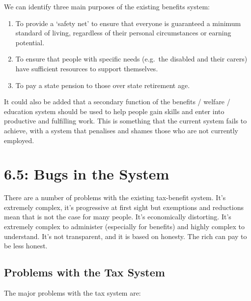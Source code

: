 \documentclass[]{tufte-handout}
\providecommand{\tightlist}{%
  \setlength{\itemsep}{0pt}\setlength{\parskip}{0pt}}
\begin{document}
We can identify three main purposes of the existing benefits system:

\begin{enumerate}
\def\labelenumi{\arabic{enumi}.}
\tightlist
\item
  To provide a `safety net' to ensure that everyone is guaranteed a
  minimum standard of living, regardless of their personal circumstances
  or earning potential.
\item
  To ensure that people with specific needs (e.g.~the disabled and their
  carers) have sufficient resources to support themselves.
\item
  To pay a state pension to those over state retirement age.
\end{enumerate}

It could also be added that a secondary function of the benefits /
welfare / education system should be used to help people gain skills and
enter into productive and fulfilling work. This is something that the
current system fails to achieve, with a system that penalises and shames
those who are not currently employed.

\hypertarget{bugs-in-the-system}{%
\section{6.5: Bugs in the System}\label{bugs-in-the-system}}

There are a number of problems with the existing tax-benefit system.
It's extremely complex, it's progressive at first sight but exemptions
and reductions mean that is not the case for many people. It's
economically distorting. It's extremely complex to administer
(especially for benefits) and highly complex to understand. It's not
transparent, and it is based on honesty. The rich can pay to be less
honest.

\hypertarget{problems-with-the-tax-system}{%
\subsection{Problems with the Tax
System}\label{problems-with-the-tax-system}}

The major problems with the tax system are:
\end{document}
